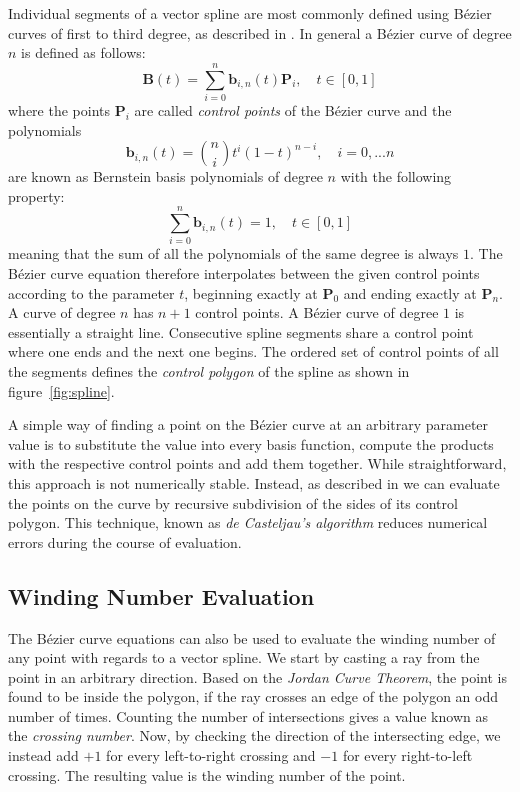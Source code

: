 \documentclass[11pt,a4paper,twoside]{article}
\begin{document}
Individual segments of a vector spline are most commonly defined using B\'{e}zier curves of first to third degree, as described in \cite{Farin02}. In general a B\'{e}zier curve of degree $n$ is defined as follows:
\[ \mathbf{B}(t) = \sum_{i=0}^{n} \mathbf{b}_{i,n}(t)\mathbf{P}_i, \quad t \in [0, 1] \]
where the points $\mathbf{P}_i$ are called \emph{control points} of the B\'{e}zier curve and the polynomials
\[ \mathbf{b}_{i,n}(t) = \binom{n}{i} t^i (1 - t)^{n-i}, \quad i = 0, ... n \]
are known as Bernstein basis polynomials of degree $n$ with the following property:
\[ \sum_{i=0}^{n} \mathbf{b}_{i,n}(t) = 1, \quad t \in [0, 1] \]
meaning that the sum of all the polynomials of the same degree is always $1$. The B\'{e}zier curve equation therefore interpolates between the given control points according to the parameter $t$, beginning exactly at $\mathbf{P}_0$ and ending exactly at $\mathbf{P}_n$. A curve of degree $n$ has $n+1$ control points. A  B\'{e}zier curve of degree $1$ is essentially a straight line. Consecutive spline segments share a control point where one ends and the next one begins. The ordered set of control points of all the segments defines the \emph{control polygon} of the spline as shown in figure~\ref{fig:spline}.

A simple way of finding a point on the  B\'{e}zier curve at an arbitrary parameter value is to substitute the value into every basis function, compute the products with the respective control points and add them together. While straightforward, this approach is not numerically stable. Instead, as described in \cite{Boehm99} we can evaluate the points on the curve by recursive subdivision of the sides of its control polygon. This technique, known as \emph{de Casteljau's algorithm} reduces numerical errors during the course of evaluation.

\subsection{Winding Number Evaluation}

The B\'{e}zier curve equations can also be used to evaluate the winding number of any point with regards to a vector spline. We start by casting a ray from the point in an arbitrary direction. Based on the \emph{Jordan Curve Theorem}, the point is found to be inside the polygon, if the ray crosses an edge of the polygon an odd number of times. Counting the number of intersections gives a value known as the \emph{crossing number}. Now, by checking the direction of the intersecting edge, we instead add $+1$ for every left-to-right crossing and $-1$ for every right-to-left crossing. The resulting value is the winding number of the point.
\end{document}
